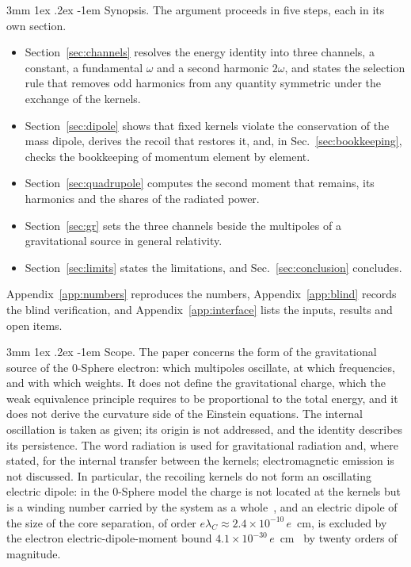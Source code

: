 \documentclass[%
 reprint, amsmath,amssymb, aps, prb, ]{revtex4-2}
\makeatletter
\numberwithin{equation}{section}
\renewcommand\paragraph{%
  \@startsection{paragraph}{4}{\z@}%
    {3mm \@plus 1ex \@minus .2ex}%
    {-1em}%
    {\normalfont\normalsize\itshape}}
\makeatother
\begin{document}
\paragraph{Synopsis.} The argument proceeds in five steps, each in its own section.
\begin{itemize}[leftmargin=1.2em, itemsep=2pt]
\item Section~\ref{sec:channels} resolves the energy identity into three channels, a constant, a fundamental $\omega$ and a second harmonic $2\omega$, and states the selection rule that removes odd harmonics from any quantity symmetric under the exchange of the kernels.
\item Section~\ref{sec:dipole} shows that fixed kernels violate the conservation of the mass dipole, derives the recoil that restores it, and, in Sec.~\ref{sec:bookkeeping}, checks the bookkeeping of momentum element by element.
\item Section~\ref{sec:quadrupole} computes the second moment that remains, its harmonics and the shares of the radiated power.
\item Section~\ref{sec:gr} sets the three channels beside the multipoles of a gravitational source in general relativity.
\item Section~\ref{sec:limits} states the limitations, and Sec.~\ref{sec:conclusion} concludes.
\end{itemize}
Appendix~\ref{app:numbers} reproduces the numbers, Appendix~\ref{app:blind} records the blind verification, and Appendix~\ref{app:interface} lists the inputs, results and open items.

\paragraph{Scope.} The paper concerns the form of the gravitational source of the 0-Sphere electron: which multipoles oscillate, at which frequencies, and with which weights. It does not define the gravitational charge, which the weak equivalence principle requires to be proportional to the total energy, and it does not derive the curvature side of the Einstein equations. The internal oscillation is taken as given; its origin is not addressed, and the identity describes its persistence. The word radiation is used for gravitational radiation and, where stated, for the internal transfer between the kernels; electromagnetic emission is not discussed. In particular, the recoiling kernels do not form an oscillating electric dipole: in the 0-Sphere model the charge is not located at the kernels but is a winding number carried by the system as a whole~\cite{H65}, and an electric dipole of the size of the core separation, of order $e\lambda_C \approx 2.4\times10^{-10}\,e$~cm, is excluded by the electron electric-dipole-moment bound $4.1\times10^{-30}\,e$~cm~\cite{Roussy2023} by twenty orders of magnitude.
\end{document}
